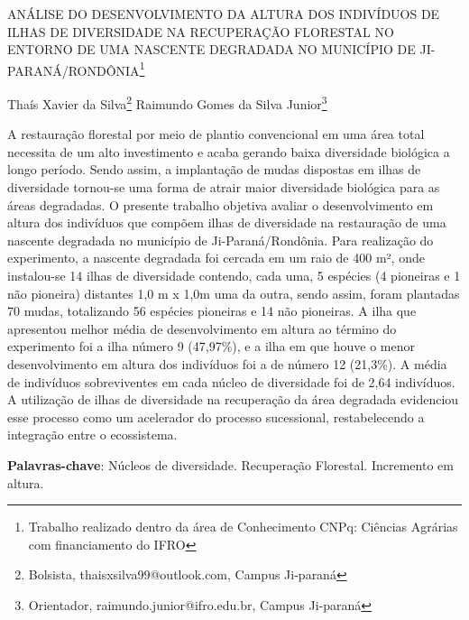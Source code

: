 \documentclass[article,12pt,onesidea,4paper,english,brazil]{abntex2}
\begin{document}
	
	
	\frenchspacing 
	
	\begin{center}
		\LARGE ANÁLISE DO DESENVOLVIMENTO DA ALTURA DOS INDIVÍDUOS DE ILHAS DE DIVERSIDADE NA RECUPERAÇÃO FLORESTAL NO ENTORNO DE UMA NASCENTE DEGRADADA NO MUNICÍPIO DE JI-PARANÁ/RONDÔNIA\footnote{Trabalho realizado dentro da área de Conhecimento CNPq: Ciências Agrárias com financiamento do IFRO}
		
		\normalsize
	Thaís Xavier da Silva\footnote{Bolsista, thaisxsilva99@outlook.com, Campus Ji-paraná} 
		Raimundo Gomes da Silva Junior\footnote{Orientador, raimundo.junior@ifro.edu.br, Campus Ji-paraná} 
	 
	\end{center}
	
	\noindent A restauração florestal por meio de plantio convencional em uma área total necessita de um alto investimento e acaba gerando baixa diversidade biológica a longo período. Sendo assim, a implantação de mudas dispostas em ilhas de diversidade tornou-se uma forma de atrair maior diversidade biológica para as áreas degradadas. O presente trabalho objetiva avaliar o desenvolvimento em altura dos indivíduos que compõem ilhas de diversidade na restauração de uma nascente degradada no município de Ji-Paraná/Rondônia. Para realização do experimento, a nascente degradada foi cercada em um raio de 400 m², onde instalou-se 14 ilhas de diversidade contendo, cada uma, 5 espécies (4 pioneiras e 1 não pioneira) distantes 1,0 m x 1,0m uma da outra, sendo assim, foram plantadas 70 mudas, totalizando 56 espécies pioneiras e 14 não pioneiras. A ilha que apresentou melhor média de desenvolvimento em altura ao término do experimento foi a ilha número 9 (47,97\%), e a ilha em que houve o menor desenvolvimento em altura dos indivíduos foi a de número 12 (21,3\%). A média de indivíduos sobreviventes em cada núcleo de diversidade foi de 2,64 indivíduos. A utilização de ilhas de diversidade na recuperação da área degradada evidenciou esse processo como um acelerador do processo sucessional, restabelecendo a integração entre o ecossistema.
	
	\vspace{\onelineskip}
	
	\noindent
	\textbf{Palavras-chave}: Núcleos de diversidade. Recuperação Florestal. Incremento em altura.
\end{document}
